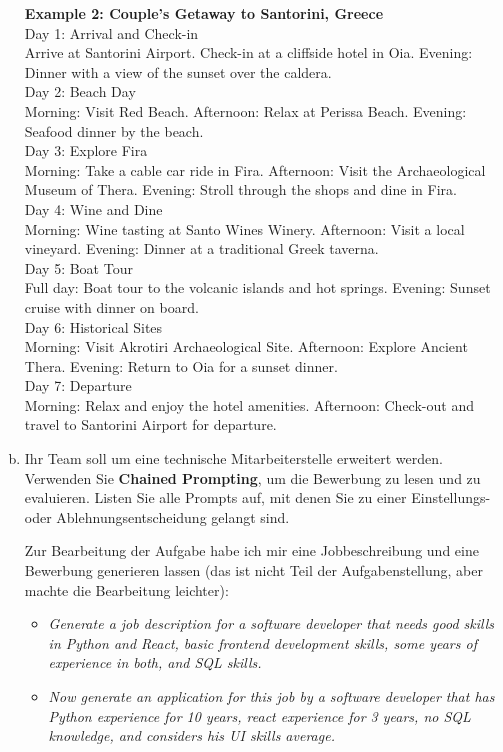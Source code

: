 \documentclass[12pt,ngerman]{AssignmentClass}
\begin{document}
\begin{enumerate}[a)]
            \textbf{Example 2: Couple's Getaway to Santorini, Greece}\\
            Day 1: Arrival and Check-in\\
            Arrive at Santorini Airport. Check-in at a cliffside hotel in Oia. Evening: Dinner with a view of the sunset over the caldera.\\
            Day 2: Beach Day\\
            Morning: Visit Red Beach. Afternoon: Relax at Perissa Beach. Evening: Seafood dinner by the beach.\\
            Day 3: Explore Fira\\
            Morning: Take a cable car ride in Fira. Afternoon: Visit the Archaeological Museum of Thera. Evening: Stroll through the shops and dine in Fira.\\
            Day 4: Wine and Dine\\
            Morning: Wine tasting at Santo Wines Winery. Afternoon: Visit a local vineyard. Evening: Dinner at a traditional Greek taverna.\\
            Day 5: Boat Tour\\
            Full day: Boat tour to the volcanic islands and hot springs. Evening: Sunset cruise with dinner on board.\\
            Day 6: Historical Sites\\
            Morning: Visit Akrotiri Archaeological Site. Afternoon: Explore Ancient Thera. Evening: Return to Oia for a sunset dinner.\\
            Day 7: Departure\\
            Morning: Relax and enjoy the hotel amenities. Afternoon: Check-out and travel to Santorini Airport for departure.\\

            \item Ihr Team soll um eine technische Mitarbeiterstelle erweitert werden. Verwenden Sie \textbf{Chained Prompting}, um die Bewerbung zu lesen und zu evaluieren. Listen Sie alle Prompts auf, mit denen Sie zu einer Einstellungs- oder Ablehnungsentscheidung gelangt sind.


            Zur Bearbeitung der Aufgabe habe ich mir eine Jobbeschreibung und eine Bewerbung generieren lassen (das ist nicht Teil der Aufgabenstellung, aber machte die Bearbeitung leichter):
            \begin{itemize}
                \item \textit{Generate a job description for a software developer that needs good skills in Python and React, basic frontend development skills, some years of experience in both, and SQL skills.}
                \item \textit{Now generate an application for this job by a software developer that has Python experience for 10 years, react experience for 3 years, no SQL knowledge, and considers his UI skills average.}
            \end{itemize}
            

\end{enumerate}
\end{document}
